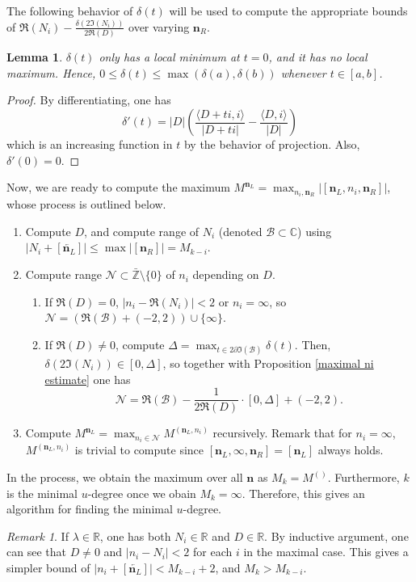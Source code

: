 \documentclass{article}
\theoremstyle{definition}
\theoremstyle{plain}
\newtheorem{lemma}{Lemma}
\theoremstyle{remark}
\newtheorem*{remark}{Remark}
\numberwithin{equation}{section}
\newcommand{\bZ}{\mathbb{Z}}
\newcommand{\bR}{\mathbb{R}}
\newcommand{\bC}{\mathbb{C}}
\newcommand{\abs}[1]{\left| {#1} \right|}
\newcommand{\inprod}[2]{\langle {#1}, {#2} \rangle}
\def\ns{{\mathbf{n}}}
\def\nsL{{\mathbf{n}_L}}
\def\nsR{{\mathbf{n}_R}}
\begin{document}
The following behavior of $\delta(t)$ will be used to compute
the appropriate bounds of $\Re(N_i) - \frac{\delta(2 \Im(N_i))}{2 \Re(D)}$ over varying $\nsR$.

\begin{lemma}
  $\delta(t)$ only has a local minimum at $t = 0$, and it has no local maximum.
  Hence, $0 \leq \delta(t) \leq \max(\delta(a), \delta(b))$ whenever $t \in [a, b]$.
\end{lemma}
\begin{proof}
  By differentiating, one has
  \[
    \delta'(t) = \abs{D} \left( \frac{\inprod{D + ti}{i}}{\abs{D + ti}} - \frac{\inprod{D}{i}}{\abs{D}} \right)
  \]
  which is an increasing function in $t$ by the behavior of projection. Also, $\delta'(0) = 0$.
\end{proof}

Now, we are ready to compute the maximum $M^{\nsL} = \max_{n_i, \nsR} \abs{[\nsL, n_i, \nsR]}$,
whose process is outlined below.
\begin{enumerate}
  \item Compute $D$, and compute range of $N_i$ (denoted $\mathcal{B} \subset \bC$)
        using $\abs{N_i + [\overleftarrow{\nsL}]} \leq \max \abs{[\nsR]} = M_{k-i}$.
  \item Compute range $\mathcal{N} \subset \bar{\bZ} \setminus \{0\}$ of $n_i$ depending on $D$.
  \begin{enumerate}
    \item If $\Re(D) = 0$, $\abs{n_i - \Re(N_i)} < 2$ or $n_i = \infty$,
          so $\mathcal{N} = (\Re(\mathcal{B}) + (-2, 2)) \cup \{\infty\}$.
    \item If $\Re(D) \neq 0$, compute $\Delta = \max_{t \in 2 \partial \Im(\mathcal{B})} \delta(t)$.
          Then, $\delta(2 \Im(N_i)) \in [0, \Delta]$, so together with Proposition \ref{maximal ni estimate} one has
          \[ \mathcal{N} = \Re(\mathcal{B}) - \frac{1}{2 \Re(D)} \cdot [0, \Delta] + (-2, 2). \]
  \end{enumerate}
  \item Compute $M^{\nsL} = \max_{n_i \in \mathcal{N}} M^{(\nsL, n_i)}$ recursively.
        Remark that for $n_i = \infty$,
        $M^{(\nsL, n_i)}$ is trivial to compute since $[\nsL, \infty, \nsR] = [\nsL]$ always holds.
\end{enumerate}

In the process, we obtain the maximum over all $\ns$ as $M_k = M^{()}$.
Furthermore, $k$ is the minimal $u$-degree once we obain $M_k = \infty$.
Therefore, this gives an algorithm for finding the minimal $u$-degree.

\begin{remark}
  If $\lambda \in \bR$, one has both $N_i \in \bR$ and $D \in \bR$.
  By inductive argument,
  one can see that $D \neq 0$ and $\abs{n_i - N_i} < 2$ for each $i$ in the maximal case.
  This gives a simpler bound of $\abs{n_i + [\overleftarrow{\nsL}]} < M_{k-i} + 2$,
  and $M_k > M_{k-i}$.
\end{remark}
\end{document}
